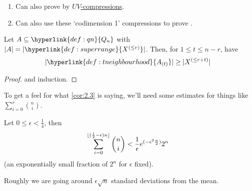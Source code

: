 \documentclass{article}
\DeclarePairedDelimiter\floor{\lfloor}{\rfloor}
\let\subset\subseteq
\begin{document}
\begin{remark}\leavevmode
  \begin{enumerate}[label=\arabic*.]
    \item Can also prove  by \hyperlink{def:uvcomp}{$UV$-compressions}.
    \item Can also use these `codimension 1' compressions to prove .
  \end{enumerate}
\end{remark}
\begin{ncor}\label{cor:2.3}
  Let $A \subset \hyperlink{def:qn}{Q_n}$ with $|A| = |\hyperlink{def:superrange}{X^{(\leq r)}}|$. Then, for $1 \leq t \leq n-r$, have
  \begin{equation*}
    |\hyperlink{def:tneighbourhood}{A_{(t)}}| \geq |X^{(\leq r + t)}|
  \end{equation*}
\end{ncor}
\begin{proof}
   and induction.
\end{proof}
To get a feel for what \cref{cor:2.3} is saying, we'll need some estimates for things like $\sum_{i=0}^r \binom{n}{i}$.
\begin{nprop}\label{prop:2.4}
  Let $0 \leq \epsilon < \frac{1}{4}$, then
  \begin{equation*}
    \sum_{i=0}^{\floor{(\frac{1}{2} - \epsilon) n}} \binom{n}{i} < \frac{1}{\epsilon} e^{(-\epsilon^2 \frac{n}{2})} 2^n
  \end{equation*}
  (an exponentially small fraction of $2^n$ for $\epsilon$ fixed).
\end{nprop}
Roughly we are going around $\epsilon \sqrt{n}$ standard deviations from the mean.
\end{document}
